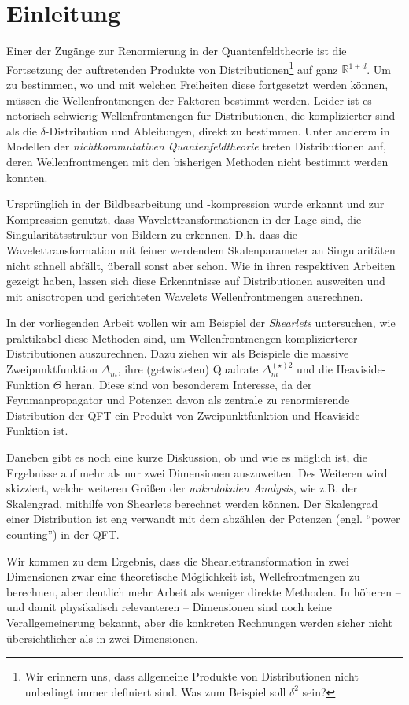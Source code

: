 
\chapter{Einleitung} %
\label{sec:einleitung_physics}
Einer der Zugänge zur Renormierung in der Quantenfeldtheorie ist die Fortsetzung der auftretenden Produkte von Distributionen\footnote{Wir erinnern uns, dass allgemeine Produkte von Distributionen nicht unbedingt immer definiert sind. Was zum Beispiel soll \(\delta^2\) sein?} auf ganz $\mathbb{R}^{1+d}$. Um zu bestimmen, wo und mit welchen Freiheiten diese fortgesetzt werden können, müssen die Wellenfrontmengen der Faktoren bestimmt werden. Leider ist es notorisch schwierig Wellenfrontmengen für Distributionen, die komplizierter sind als die $\delta$-Distribution und Ableitungen, direkt zu bestimmen. Unter anderem in Modellen der \emph{nichtkommutativen Quantenfeldtheorie} \cite{kappaMinkowski,Doplicher1995,StringLocalized} treten Distributionen auf, deren Wellenfrontmengen mit den bisherigen Methoden nicht bestimmt werden konnten.

Ursprünglich in der Bildbearbeitung und -kompression wurde erkannt und zur Kompression genutzt, dass Wavelettransformationen in der Lage sind, die Singularitätsstruktur von Bildern zu erkennen. D.h. dass die Wavelettransformation mit feiner werdendem Skalenparameter an Singularitäten nicht schnell abfällt, überall sonst aber schon.
Wie \textcite{Kutyniok2008,Candes2005,Contourlets} in ihren respektiven Arbeiten gezeigt haben, lassen sich diese Erkenntnisse auf Distributionen ausweiten und mit anisotropen und gerichteten Wavelets Wellenfrontmengen ausrechnen.

In der vorliegenden Arbeit wollen wir am Beispiel der \emph{Shearlets} untersuchen, wie praktikabel diese Methoden sind, um Wellenfrontmengen komplizierterer Distributionen auszurechnen. Dazu ziehen wir als Beispiele die massive Zweipunktfunktion \(\Delta_m\), ihre (getwisteten) Quadrate \(\Delta_m^{(\star) 2}\) und die Heaviside-Funktion \(\Theta\) heran. Diese sind von besonderem Interesse, da der Feynmanpropagator und Potenzen davon als zentrale zu renormierende Distribution der QFT ein Produkt von Zweipunktfunktion und Heaviside-Funktion ist.

Daneben gibt es noch eine kurze Diskussion, ob und wie es möglich ist, die Ergebnisse auf mehr als nur zwei Dimensionen auszuweiten.
Des Weiteren wird skizziert, welche weiteren Größen der \emph{mikrolokalen Analysis}, wie z.B. der Skalengrad, mithilfe von Shearlets berechnet werden können. Der Skalengrad einer Distribution ist eng verwandt mit dem abzählen der Potenzen (engl. "`power counting"') in der QFT.

Wir kommen zu dem Ergebnis, dass die Shearlettransformation in zwei Dimensionen zwar eine theoretische Möglichkeit ist, Wellefrontmengen zu berechnen, aber deutlich mehr Arbeit als weniger direkte Methoden. In höheren -- und damit physikalisch relevanteren -- Dimensionen sind noch keine Verallgemeinerung bekannt, aber die konkreten Rechnungen werden sicher nicht übersichtlicher als in zwei Dimensionen.


